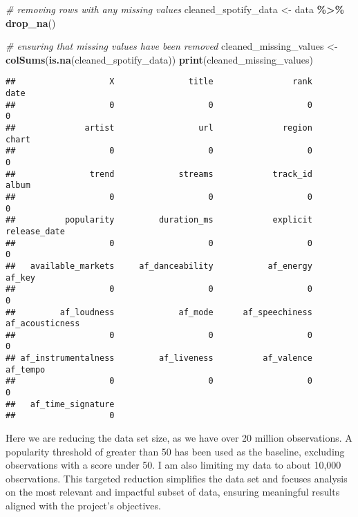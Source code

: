 \documentclass[
]{article}
\newenvironment{Shaded}{\begin{snugshade}}{\end{snugshade}}
\newcommand{\CommentTok}[1]{\textcolor[rgb]{0.56,0.35,0.01}{\textit{#1}}}
\newcommand{\FunctionTok}[1]{\textcolor[rgb]{0.13,0.29,0.53}{\textbf{#1}}}
\newcommand{\NormalTok}[1]{#1}
\newcommand{\OtherTok}[1]{\textcolor[rgb]{0.56,0.35,0.01}{#1}}
\newcommand{\SpecialCharTok}[1]{\textcolor[rgb]{0.81,0.36,0.00}{\textbf{#1}}}
\begin{document}
\begin{Shaded}
\begin{Highlighting}[]
\CommentTok{\# removing rows with any missing values}
\NormalTok{cleaned\_spotify\_data }\OtherTok{\textless{}{-}}\NormalTok{ data }\SpecialCharTok{\%\textgreater{}\%} \FunctionTok{drop\_na}\NormalTok{()}

\CommentTok{\# ensuring that missing values have been removed}
\NormalTok{cleaned\_missing\_values }\OtherTok{\textless{}{-}}\FunctionTok{colSums}\NormalTok{(}\FunctionTok{is.na}\NormalTok{(cleaned\_spotify\_data))}
\FunctionTok{print}\NormalTok{(cleaned\_missing\_values)}
\end{Highlighting}
\end{Shaded}

\begin{verbatim}
##                   X               title                rank                date 
##                   0                   0                   0                   0 
##              artist                 url              region               chart 
##                   0                   0                   0                   0 
##               trend             streams            track_id               album 
##                   0                   0                   0                   0 
##          popularity         duration_ms            explicit        release_date 
##                   0                   0                   0                   0 
##   available_markets     af_danceability           af_energy              af_key 
##                   0                   0                   0                   0 
##         af_loudness             af_mode      af_speechiness     af_acousticness 
##                   0                   0                   0                   0 
## af_instrumentalness         af_liveness          af_valence            af_tempo 
##                   0                   0                   0                   0 
##   af_time_signature 
##                   0
\end{verbatim}

Here we are reducing the data set size, as we have over 20 million
observations. A popularity threshold of greater than 50 has been used as
the baseline, excluding observations with a score under 50. I am also
limiting my data to about 10,000 observations. This targeted reduction
simplifies the data set and focuses analysis on the most relevant and
impactful subset of data, ensuring meaningful results aligned with the
project's objectives.
\end{document}
